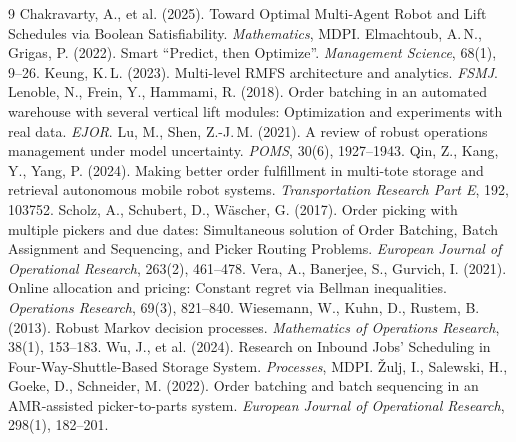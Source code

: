 \documentclass[11pt, a4paper]{article}
\begin{document}
\begin{thebibliography}{9}
   Chakravarty, A., et al. (2025). Toward Optimal Multi-Agent Robot and Lift Schedules via Boolean Satisfiability. \emph{Mathematics}, MDPI.
   Elmachtoub, A.\,N., Grigas, P. (2022). Smart ``Predict, then Optimize''. \emph{Management Science}, 68(1), 9--26.
   Keung, K.\,L. (2023). Multi-level RMFS architecture and analytics. \emph{FSMJ}.
   Lenoble, N., Frein, Y., Hammami, R. (2018). Order batching in an automated warehouse with several vertical lift modules: Optimization and experiments with real data. \emph{EJOR}.
   Lu, M., Shen, Z.-J.\,M. (2021). A review of robust operations management under model uncertainty. \emph{POMS}, 30(6), 1927--1943.
   Qin, Z., Kang, Y., Yang, P. (2024). Making better order fulfillment in multi-tote storage and retrieval autonomous mobile robot systems. \emph{Transportation Research Part E}, 192, 103752.
   Scholz, A., Schubert, D., W\"ascher, G. (2017). Order picking with multiple pickers and due dates: Simultaneous solution of Order Batching, Batch Assignment and Sequencing, and Picker Routing Problems. \emph{European Journal of Operational Research}, 263(2), 461--478.
   Vera, A., Banerjee, S., Gurvich, I. (2021). Online allocation and pricing: Constant regret via Bellman inequalities. \emph{Operations Research}, 69(3), 821--840.
   Wiesemann, W., Kuhn, D., Rustem, B. (2013). Robust Markov decision processes. \emph{Mathematics of Operations Research}, 38(1), 153--183.
   Wu, J., et al. (2024). Research on Inbound Jobs' Scheduling in Four-Way-Shuttle-Based Storage System. \emph{Processes}, MDPI.
   \v{Z}ulj, I., Salewski, H., Goeke, D., Schneider, M. (2022). Order batching and batch sequencing in an AMR-assisted picker-to-parts system. \emph{European Journal of Operational Research}, 298(1), 182--201.
\end{thebibliography}
\end{document}
